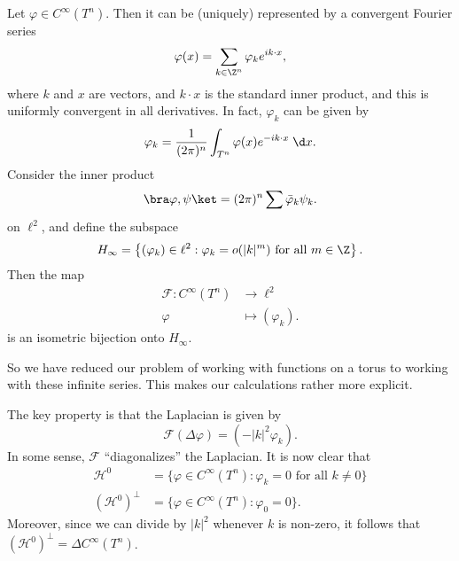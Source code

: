 \documentclass[a4paper]{article}
\begin{document}
\begin{fact}
  Let $\varphi \in C^\infty (T^n)$. Then it can be (uniquely) represented by a convergent Fourier series
  \[
    \varphi(x) = \sum_{k \in \Z^n} \varphi_k e^{ik \cdot x},
  \]
  where $k$ and $x$ are vectors, and $k \cdot x$ is the standard inner product, and this is uniformly convergent in all derivatives. In fact, $\varphi_k$ can be given by
  \[
    \varphi_k = \frac{1}{(2\pi)^n} \int_{T^n} \varphi(x) e^{-ik\cdot x}\;\d x.
  \]
  Consider the inner product
  \[
    \bra \varphi, \psi\ket = (2\pi)^n \sum \bar\varphi_k \psi_k.
  \]
  on $\ell^2$, and define the subspace
  \[
    H_\infty = \left\{(\varphi_k) \in \ell^2: \varphi_k = o(|k|^m) \text{ for all }m \in \Z\right\}.
  \]
  Then the map
  \begin{align*}
    \mathcal{F}: C^\infty(T^n) &\to \ell^2\\
    \varphi &\mapsto (\varphi_k).
  \end{align*}
  is an isometric bijection onto $H_\infty$.
\end{fact}
So we have reduced our problem of working with functions on a torus to working with these infinite series. This makes our calculations rather more explicit.

The key property is that the Laplacian is given by
\[
  \mathcal{F}(\Delta \varphi) = (-|k|^2 \varphi_k).
\]
In some sense, $\mathcal{F}$ ``diagonalizes'' the Laplacian. It is now clear that
\begin{align*}
  \mathcal{H}^0 &= \{\varphi \in C^\infty(T^n) : \varphi_k = 0\text{ for all }k \not =0\}\\
  (\mathcal{H}^0)^\perp &= \{\varphi \in C^\infty(T^n) : \varphi_0 = 0\}.
\end{align*}
Moreover, since we can divide by $|k|^2$ whenever $k$ is non-zero, it follows that $(\mathcal{H}^0)^\perp = \Delta C^\infty(T^n)$.
\end{document}
